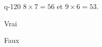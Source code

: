 \begin{truefalse}{q-120}
$8\times 7 = 56$ et $9\times 6 = 53$.
\item Vrai
\item* Faux
\end{truefalse}

